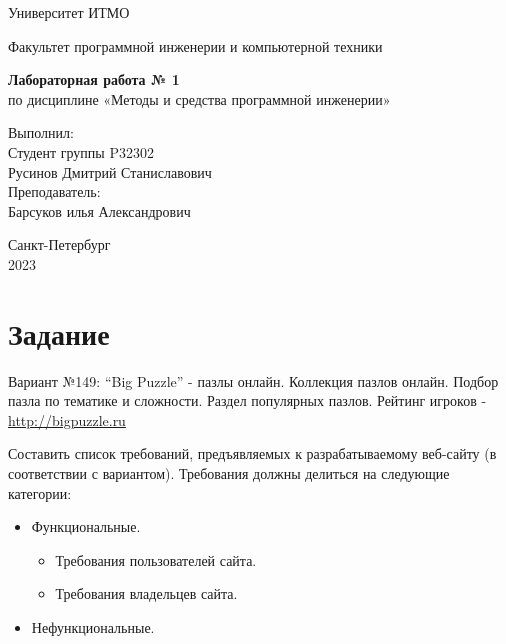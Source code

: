 \documentclass[12pt]{article}
\begin{document}
\begin{center}
    Университет ИТМО
\end{center}
\vspace{0,5cm}

\begin{center}
Факультет программной инженерии и компьютерной техники
\end{center}

\vspace{1cm}


\begin{center}
    
    \textbf{Лабораторная работа № 1}\\
    по дисциплине «Методы и средства программной инженерии» \\

\end{center}

\vspace{10cm}

\begin{flushright}
    Выполнил:\\
    Студент группы P32302 \\
    Русинов Дмитрий Станиславович\\
    Преподаватель: \\
    Барсуков илья Александрович\\
\end{flushright}

\vspace{3cm}

\begin{center}
    Санкт-Петербург\\
    2023
\end{center}

\newpage
{} %

\tableofcontents

\newpage

\section*{Задание}
 Вариант №149: \enquote{Big Puzzle} - пазлы онлайн. Коллекция пазлов онлайн. Подбор пазла по тематике и сложности. Раздел популярных пазлов. Рейтинг игроков - \url{http://bigpuzzle.ru}

 Составить список требований, предъявляемых к разрабатываемому веб-сайту (в соответствии с вариантом). Требования должны делиться на следующие категории:
 \begin{itemize}[itemsep=0.5ex]
     \item Функциональные.
        \begin{itemize}[itemsep=0.5ex]
            \item Требования пользователей сайта.
            \item Требования владельцев сайта.
        \end{itemize}
    \item Нефункциональные.
 \end{itemize}
\end{document}
